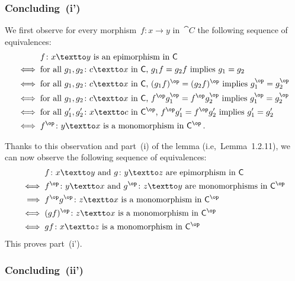 \subsubsection*{Concluding~(i')}

We first observe for every morphism~$f \colon x \to y$ in~$\cat{C}$ the following sequence of equivalences:
\begin{align*}
	{}&
	\text{$f \colon x \textto y$ is an epimorphism in~$\cat{C}$}
	\\
	\iff{}&
	\text{for all~$g_1, g_2 \colon c \textto x$ in~$\cat{C}$,~$g_1 f = g_2 f$ implies~$g_1 = g_2$}
	\\
	\iff{}&
	\text{for all~$g_1, g_2 \colon c \textto x$ in~$\cat{C}$,~$(g_1 f)^{\op} = (g_2 f)^{\op}$ implies~$g_1^{\op} = g_2^{\op}$}
	\\
	\iff{}&
	\text{for all~$g_1, g_2 \colon c \textto x$ in~$\cat{C}$,~$f^{\op} g_1^{\op} = f^{\op} g_2^{\op}$ implies~$g_1^{\op} = g_2^{\op}$}
	\\
	\iff{}&
	\text{for all~$g'_1, g'_2 \colon x \textto c$ in~$\cat{C}^{\op}$,~$f^{\op} g'_1 = f^{\op} g'_2$ implies~$g'_1 = g'_2$}
	\\
	\iff{}&
	\text{$f^{\op} \colon y \textto x$ is a monomorphism in~$\cat{C}^{\op}$} \,.
\end{align*}

Thanks to this observation and part~(i) of the lemma (i.e,~Lemma~1.2.11), we can now observe the following sequence of equivalences:
\begin{align*}
	{}&
	\text{$f \colon x \textto y$ and~$g \colon y \textto z$ are epimorphism in~$\cat{C}$}
	\\
	\iff{}&
	\text{$f^{\op} \colon y \textto x$ and~$g^{\op} \colon z \textto y$ are monomorphisms in~$\cat{C}^{\op}$}
	\\
	\implies{}&
	\text{$f^{\op} g^{\op} \colon z \textto x$ is a monomorphism in~$\cat{C}^{\op}$}
	\\
	\iff{}&
	\text{$(g f)^{\op} \colon z \textto x$ is a monomorphism in~$\cat{C}^{\op}$}
	\\
	\iff{}&
	\text{$g f \colon x \textto z$ is a monomorphism in~$\cat{C}^{\op}$}
\end{align*}
This proves part~(i').



\subsubsection*{Concluding~(ii')}

